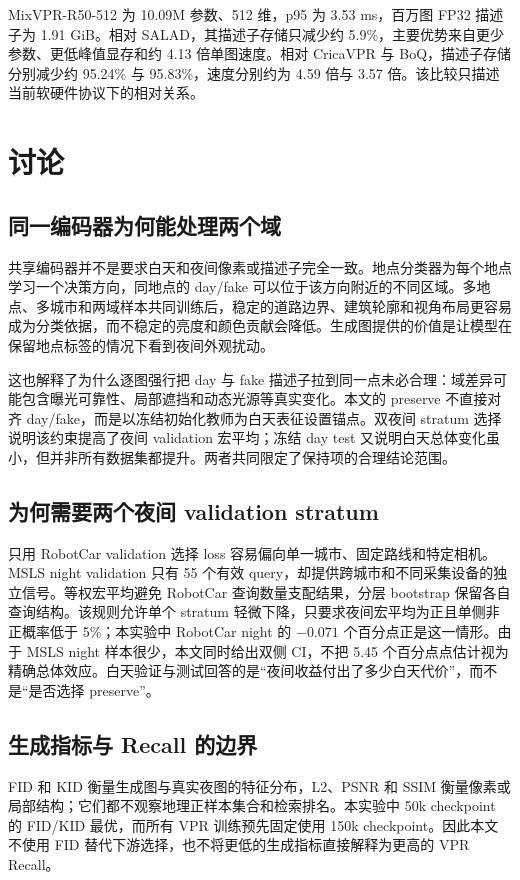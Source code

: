 \documentclass[UTF8,a4paper,11pt]{ctexart}
\begin{document}
MixVPR-R50-512 为 10.09M 参数、512 维，p95 为 3.53 ms，百万图 FP32 描述子为 1.91 GiB。相对 SALAD，其描述子存储只减少约 5.9\%，主要优势来自更少参数、更低峰值显存和约 4.13 倍单图速度。相对 CricaVPR 与 BoQ，描述子存储分别减少约 95.24\% 与 95.83\%，速度分别约为 4.59 倍与 3.57 倍。该比较只描述当前软硬件协议下的相对关系。

\section{讨论}
\subsection{同一编码器为何能处理两个域}
共享编码器并不是要求白天和夜间像素或描述子完全一致。地点分类器为每个地点学习一个决策方向，同地点的 day/fake 可以位于该方向附近的不同区域。多地点、多城市和两域样本共同训练后，稳定的道路边界、建筑轮廓和视角布局更容易成为分类依据，而不稳定的亮度和颜色贡献会降低。生成图提供的价值是让模型在保留地点标签的情况下看到夜间外观扰动。

这也解释了为什么逐图强行把 day 与 fake 描述子拉到同一点未必合理：域差异可能包含曝光可靠性、局部遮挡和动态光源等真实变化。本文的 preserve 不直接对齐 day/fake，而是以冻结初始化教师为白天表征设置锚点。双夜间 stratum 选择说明该约束提高了夜间 validation 宏平均；冻结 day test 又说明白天总体变化虽小，但并非所有数据集都提升。两者共同限定了保持项的合理结论范围。

\subsection{为何需要两个夜间 validation stratum}
只用 RobotCar validation 选择 loss 容易偏向单一城市、固定路线和特定相机。MSLS night validation 只有 55 个有效 query，却提供跨城市和不同采集设备的独立信号。等权宏平均避免 RobotCar 查询数量支配结果，分层 bootstrap 保留各自查询结构。该规则允许单个 stratum 轻微下降，只要求夜间宏平均为正且单侧非正概率低于 5\%；本实验中 RobotCar night 的 $-0.071$ 个百分点正是这一情形。由于 MSLS night 样本很少，本文同时给出双侧 CI，不把 5.45 个百分点点估计视为精确总体效应。白天验证与测试回答的是“夜间收益付出了多少白天代价”，而不是“是否选择 preserve”。

\subsection{生成指标与 Recall 的边界}
FID 和 KID 衡量生成图与真实夜图的特征分布，L2、PSNR 和 SSIM 衡量像素或局部结构；它们都不观察地理正样本集合和检索排名。本实验中 50k checkpoint 的 FID/KID 最优，而所有 VPR 训练预先固定使用 150k checkpoint。因此本文不使用 FID 替代下游选择，也不将更低的生成指标直接解释为更高的 VPR Recall。
\end{document}
